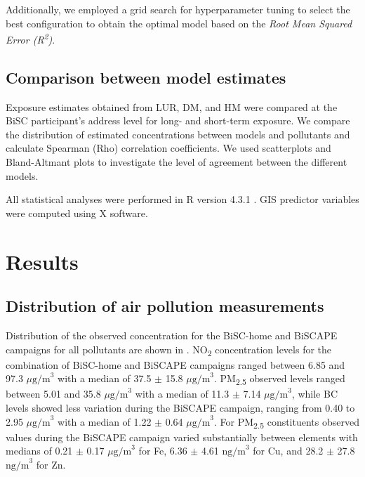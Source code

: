 \documentclass{article}
\begin{document}
Additionally, we employed a grid search for hyperparameter tuning to select the best configuration to obtain the optimal model based on the \textit{Root Mean Squared Error (R\textsuperscript{2})}. 

\subsection{Comparison between model estimates}
Exposure estimates obtained from LUR, DM, and HM were compared at the BiSC participant's address level for long- and short-term exposure. We compare the distribution of estimated concentrations between models and pollutants and calculate Spearman (Rho) correlation coefficients. We used scatterplots and Bland-Altmant plots to investigate the level of agreement between the different models.  

All statistical analyses were performed in R version 4.3.1 \cite{Rstudio}. GIS predictor variables were computed using X software. 

\section{Results}

\subsection{Distribution of air pollution measurements}

Distribution of the observed concentration for the BiSC-home and BiSCAPE campaigns for all pollutants are shown in . NO\textsubscript{2} concentration levels for the combination of BiSC-home and BiSCAPE campaigns ranged between 6.85 and 97.3 \(\mu \text{g/m}^3\) with a median of  37.5 \(\pm\) 15.8 \( \mu \text{g/m}^3\). PM\textsubscript{2.5} observed levels ranged between 5.01 and 35.8 \( \mu \text{g/m}^3\) with a median of 11.3 \(\pm\) 7.14 \(\mu \text{g/m}^3\), while BC levels showed less variation during the BiSCAPE campaign, ranging from 0.40 to 2.95 \(  \mu \text{g/m}^3\) with a median of 1.22 \(\pm\) 0.64 \( \mu \text{g/m}^3\). For PM\textsubscript{2.5} constituents  observed values during the BiSCAPE campaign varied substantially between elements with medians of 0.21 \(\pm\) 0.17 \(  \mu \text{g/m}^3\)  for  Fe,  6.36 \(\pm\) 4.61 \( \text{ng/m}^3 \) for Cu, and 28.2 \(\pm\) 27.8 \( \text{ng/m}^3 \) for Zn. 
\end{document}

